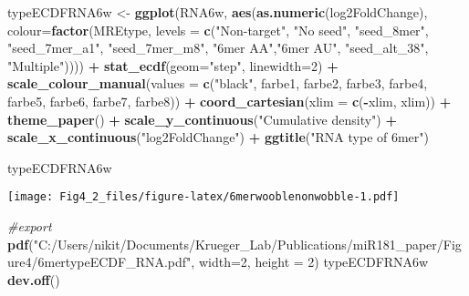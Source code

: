 \documentclass[
]{article}
\newenvironment{Shaded}{\begin{snugshade}}{\end{snugshade}}
\newcommand{\AttributeTok}[1]{\textcolor[rgb]{0.13,0.29,0.53}{#1}}
\newcommand{\CommentTok}[1]{\textcolor[rgb]{0.56,0.35,0.01}{\textit{#1}}}
\newcommand{\DecValTok}[1]{\textcolor[rgb]{0.00,0.00,0.81}{#1}}
\newcommand{\FunctionTok}[1]{\textcolor[rgb]{0.13,0.29,0.53}{\textbf{#1}}}
\newcommand{\NormalTok}[1]{#1}
\newcommand{\OtherTok}[1]{\textcolor[rgb]{0.56,0.35,0.01}{#1}}
\newcommand{\SpecialCharTok}[1]{\textcolor[rgb]{0.81,0.36,0.00}{\textbf{#1}}}
\newcommand{\StringTok}[1]{\textcolor[rgb]{0.31,0.60,0.02}{#1}}
\begin{document}
\begin{Shaded}
\begin{Highlighting}[]
\NormalTok{typeECDFRNA6w }\OtherTok{\textless{}{-}} \FunctionTok{ggplot}\NormalTok{(RNA6w, }\FunctionTok{aes}\NormalTok{(}\FunctionTok{as.numeric}\NormalTok{(log2FoldChange), }
                              \AttributeTok{colour=}\FunctionTok{factor}\NormalTok{(MREtype, }\AttributeTok{levels =} \FunctionTok{c}\NormalTok{(}\StringTok{"Non{-}target"}\NormalTok{, }\StringTok{"No seed"}\NormalTok{, }\StringTok{"seed\_8mer"}\NormalTok{, }\StringTok{"seed\_7mer\_a1"}\NormalTok{, }\StringTok{"seed\_7mer\_m8"}\NormalTok{, }\StringTok{"6mer AA"}\NormalTok{,}\StringTok{"6mer AU"}\NormalTok{, }\StringTok{"seed\_alt\_38"}\NormalTok{, }\StringTok{"Multiple"}\NormalTok{)))) }\SpecialCharTok{+} 
  \FunctionTok{stat\_ecdf}\NormalTok{(}\AttributeTok{geom=}\StringTok{"step"}\NormalTok{, }\AttributeTok{linewidth=}\DecValTok{2}\NormalTok{) }\SpecialCharTok{+}
  \FunctionTok{scale\_colour\_manual}\NormalTok{(}\AttributeTok{values =} \FunctionTok{c}\NormalTok{(}\StringTok{"black"}\NormalTok{, farbe1, farbe2, farbe3, farbe4, farbe5, farbe6, farbe7, farbe8)) }\SpecialCharTok{+}
  \FunctionTok{coord\_cartesian}\NormalTok{(}\AttributeTok{xlim =} \FunctionTok{c}\NormalTok{(}\SpecialCharTok{{-}}\NormalTok{xlim, xlim)) }\SpecialCharTok{+} 
  \FunctionTok{theme\_paper}\NormalTok{() }\SpecialCharTok{+}
  \FunctionTok{scale\_y\_continuous}\NormalTok{(}\StringTok{"Cumulative density"}\NormalTok{) }\SpecialCharTok{+} \FunctionTok{scale\_x\_continuous}\NormalTok{(}\StringTok{"log2FoldChange"}\NormalTok{) }\SpecialCharTok{+}
  \FunctionTok{ggtitle}\NormalTok{(}\StringTok{"RNA type of 6mer"}\NormalTok{)}

\NormalTok{typeECDFRNA6w}
\end{Highlighting}
\end{Shaded}

\texttt{[image: Fig4\_2\_files/figure-latex/6merwooblenonwobble-1.pdf]}

\begin{Shaded}
\begin{Highlighting}[]
\CommentTok{\#export}
\FunctionTok{pdf}\NormalTok{(}\StringTok{"C:/Users/nikit/Documents/Krueger\_Lab/Publications/miR181\_paper/Figure4/6mertypeECDF\_RNA.pdf"}\NormalTok{, }\AttributeTok{width=}\DecValTok{2}\NormalTok{, }\AttributeTok{height =} \DecValTok{2}\NormalTok{)}
\NormalTok{typeECDFRNA6w}
\FunctionTok{dev.off}\NormalTok{()}
\end{Highlighting}
\end{Shaded}
\end{document}
